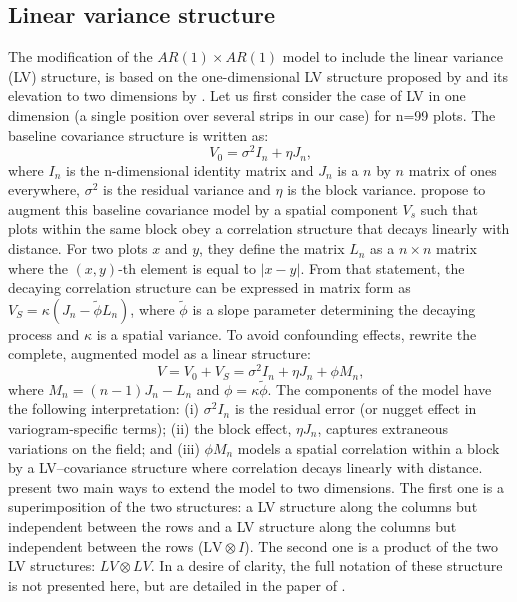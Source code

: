 \subsection{Linear variance structure}
The modification of the $AR(1) \times AR(1)$ model to include the linear variance (LV) structure, is based on the one-dimensional LV structure proposed by \textcite{williams_neighbour_1986} and its elevation to two dimensions by \textcite{piepho_linear_2010}.
Let us first consider the case of LV in one dimension (a single position over several strips in our case) for n=99 plots. The baseline covariance structure is written as:
\begin{equation}
	V_{0}=\sigma^{2} I_{n}+\eta J_{n}
	\text{,}
\end{equation}
where $I_{n}$ is the n-dimensional identity matrix and $J_{n}$ is a $n$ by $n$ matrix of ones everywhere, $\sigma^2$ is the residual variance and $\eta$ is the block variance. 
\textcite{williams_neighbour_1986} propose to augment this baseline covariance model by a spatial component $V_{s}$ such that plots within the same block obey a correlation structure that decays linearly with distance. 
For two plots $x$ and $y$, they define the matrix $L_n$ as a $n\times n$ matrix where the $(x,y)$-th element is equal to $|x-y|$. 
From that statement, the decaying correlation structure can be expressed in matrix form as $V_{S}=\kappa\left(J_{n}-\tilde{\phi} L_{n}\right)$, where $\tilde{\phi}$ is a slope parameter determining the decaying process and $\kappa$ is a spatial variance. 
To avoid confounding effects, \textcite{williams_neighbour_1986} rewrite the complete, augmented model as a linear structure:
\begin{equation}
	V=V_{0}+V_{S}=\sigma^{2} I_{n}+\eta J_{n}+\phi M_{n}
	\text{,}
\end{equation}
where $M_n = (n-1)J_n - L_n$ and $\phi = \kappa\tilde{\phi}$. The components of the model have the following interpretation: (i) $\sigma^{2} I_{n}$ is the residual error (or nugget effect in variogram-specific terms); (ii) the block effect, $\eta J_n$, captures extraneous variations on the field; and (iii) $\phi M_n$ models a spatial correlation within a block by a LV–covariance structure where correlation decays linearly with distance.\\

\textcite{piepho_linear_2010} present two main ways to extend the model to two dimensions. The first one is a superimposition of the two structures: a LV structure along the columns but independent between the rows  and a LV structure along the columns but independent between the rows ($\mathrm{LV} \otimes I$). The second one is a product of the two LV structures: $LV \otimes LV$. In a desire of clarity, the full notation of these structure is not presented here, but are detailed in the paper of \textcite{piepho_linear_2010}.\\

